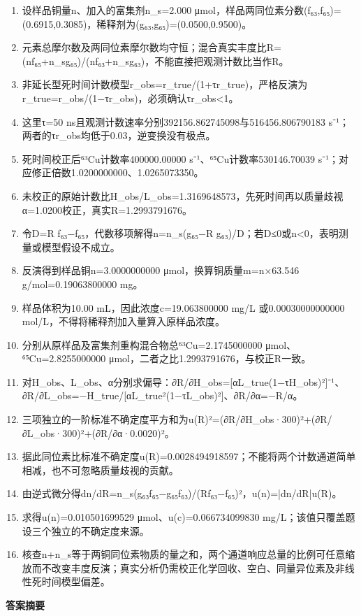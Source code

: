 \documentclass[UTF8,11pt,a4paper]{ctexart}
\begin{document}
\begin{enumerate}
\item 设样品铜量n、加入的富集剂n\_s=2.000 μmol，样品两同位素分数(f₆₃,f₆₅)=(0.6915,0.3085)，稀释剂为(g₆₃,g₆₅)=(0.0500,0.9500)。
\item 元素总摩尔数及两同位素摩尔数均守恒；混合真实丰度比R=(nf₆₅+n\_sg₆₅)/(nf₆₃+n\_sg₆₃)，不能直接把观测计数比当作R。
\item 非延长型死时间计数模型r\_obs=r\_true/(1+τr\_true)，严格反演为r\_true=r\_obs/(1−τr\_obs)，必须确认τr\_obs<1。
\item 这里τ=50 ns且观测计数速率分别392156.862745098与516456.806790183 s⁻¹；两者的τr\_obs均低于0.03，逆变换没有极点。
\item 死时间校正后⁶³Cu计数率400000.00000 s⁻¹、⁶⁵Cu计数率530146.70039 s⁻¹；对应修正倍数1.0200000000、1.0265073350。
\item 未校正的原始计数比H\_obs/L\_obs=1.3169648573，先死时间再以质量歧视α=1.0200校正，真实R=1.2993791676。
\item 令D=R f₆₃−f₆₅，代数移项解得n=n\_s(g₆₅−R g₆₃)/D；若D≤0或n<0，表明测量或模型假设不成立。
\item 反演得到样品铜n=3.0000000000 μmol，换算铜质量m=n×63.546 g/mol=0.19063800000 mg。
\item 样品体积为10.00 mL，因此浓度c=19.063800000 mg/L 或0.00030000000000 mol/L，不得将稀释剂加入量算入原样品浓度。
\item 分别从原样品及富集剂重构混合物总⁶³Cu=2.1745000000 μmol、⁶⁵Cu=2.8255000000 μmol，二者之比1.2993791676，与校正R一致。
\item 对H\_obs、L\_obs、α分别求偏导：∂R/∂H\_obs=[αL\_true(1−τH\_obs)²]⁻¹、∂R/∂L\_obs=−H\_true/[αL\_true²(1−τL\_obs)²]、∂R/∂α=−R/α。
\item 三项独立的一阶标准不确定度平方和为u(R)²=(∂R/∂H\_obs·300)²+(∂R/∂L\_obs·300)²+(∂R/∂α·0.0020)²。
\item 据此同位素比标准不确定度u(R)=0.0028494918597；不能将两个计数通道简单相减，也不可忽略质量歧视的贡献。
\item 由逆式微分得dn/dR=n\_s(g₆₃f₆₅−g₆₅f₆₃)/(Rf₆₃−f₆₅)²，u(n)=|dn/dR|u(R)。
\item 求得u(n)=0.010501699529 μmol、u(c)=0.066734099830 mg/L；该值只覆盖题设三个独立的不确定度来源。
\item 核查n+n\_s等于两铜同位素物质的量之和，两个通道响应总量的比例可任意缩放而不改变丰度反演；真实分析仍需校正化学回收、空白、同量异位素及非线性死时间模型偏差。
\end{enumerate}
\noindent\textbf{答案摘要}\par
\end{document}
